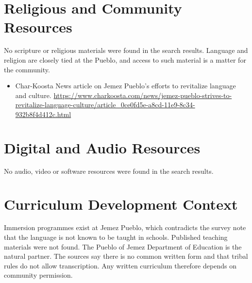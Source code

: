 \documentclass[12pt]{article}
\begin{document}
\section{Religious and Community Resources}
No scripture or religious materials were found in the search results. Language and religion are closely tied at the Pueblo, and access to such material is a matter for the community.
\begin{itemize}
\item Char-Koosta News article on Jemez Pueblo's efforts to revitalize language and culture. \url{https://www.charkoosta.com/news/jemez-pueblo-strives-to-revitalize-language-culture/article_0ce0fd5e-a8cd-11e9-8c34-932b8f4d412c.html}
\end{itemize}

\section{Digital and Audio Resources}
No audio, video or software resources were found in the search results.

\section{Curriculum Development Context}
Immersion programmes exist at Jemez Pueblo, which contradicts the survey note that the language is not known to be taught in schools. Published teaching materials were not found. The Pueblo of Jemez Department of Education is the natural partner. The sources say there is no common written form and that tribal rules do not allow transcription. Any written curriculum therefore depends on community permission.
\end{document}
